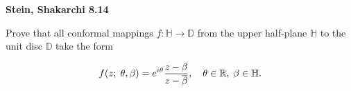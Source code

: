 \textbf{Stein, Shakarchi 8.14}

Prove that all conformal mappings $f: \mathbb{H} \to \mathbb{D}$ from the upper half-plane $\mathbb{H}$ to the unit disc 
$\mathbb{D}$ take the form

$$
f(z; \; \theta, \beta) = e^{i \theta} \frac{z - \beta}{z - \overline{\beta}}, \quad \theta \in \mathbb{R}, \; \beta \in \mathbb{H}.
$$

\begin{solution}
  \ \\
\end{solution}
